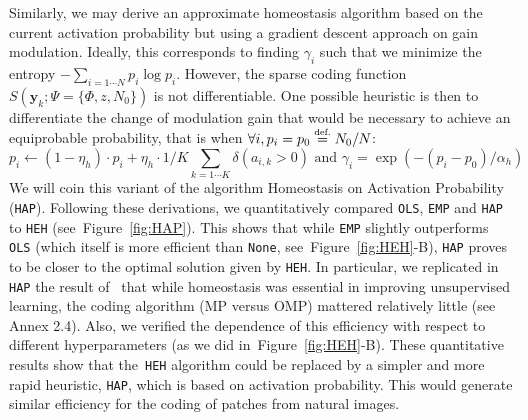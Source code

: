\documentclass[draft]{article} %
\newcommand{\image}{\mathbf{y}} %
\newcommand{\dico}{\Phi} %
\newcommand{\eqdef}{\ensuremath{\stackrel{\mbox{\upshape\tiny def.}}{=}}}
\newcommand{\seeFig}[1]{Figure~\ref{fig:#1}}%
\begin{document}
Similarly, we may derive an approximate homeostasis algorithm based on the current activation probability but using a gradient descent approach on gain modulation. Ideally, this corresponds to finding $\gamma_i$ such that we minimize the entropy $-\sum_{i=1\cdots N} p_i \log p_i$. However, the sparse coding function $S(\image_k; \Psi=\{\dico, z, N_0\})$ is not differentiable. %
One possible heuristic is then to differentiate the change of modulation gain that would be necessary to achieve an equiprobable probability, that is when $\forall i, p_i = p_0 \eqdef N_0 / N$: %
\begin{equation}%
p_i \leftarrow (1- \eta_h ) \cdot p_i + \eta_h \cdot 1/K\sum_{k=1\cdots K} \delta(a_{i, k} > 0) \textrm{ and }
\gamma_i = \exp(-(p_i - p_0) / \alpha_h)
\end{equation}%
We will coin this variant of the algorithm Homeostasis on Activation Probability (\texttt{HAP}). %
Following these derivations, we quantitatively compared \texttt{OLS}, \texttt{EMP} and \texttt{HAP} to \texttt{HEH} (see~\seeFig{HAP}). This shows that while \texttt{EMP} slightly outperforms \texttt{OLS} (which itself is more efficient than \texttt{None}, see~\seeFig{HEH}-B), \texttt{HAP} proves to be closer to the optimal solution given by \texttt{HEH}. %
In particular, we replicated in \texttt{HAP} the result of~\citet{Sandin17} that while homeostasis was essential in improving unsupervised learning, the coding algorithm (MP versus OMP) mattered relatively little (see Annex 2.4). Also, we verified the dependence of this efficiency with respect to different hyperparameters (as we did in~\seeFig{HEH}-B). %
These quantitative results show that the~\texttt{HEH} algorithm could be replaced by a simpler and more rapid heuristic, \texttt{HAP}, which is based on activation probability. This would generate similar efficiency for the coding of patches from natural images.
\end{document}
